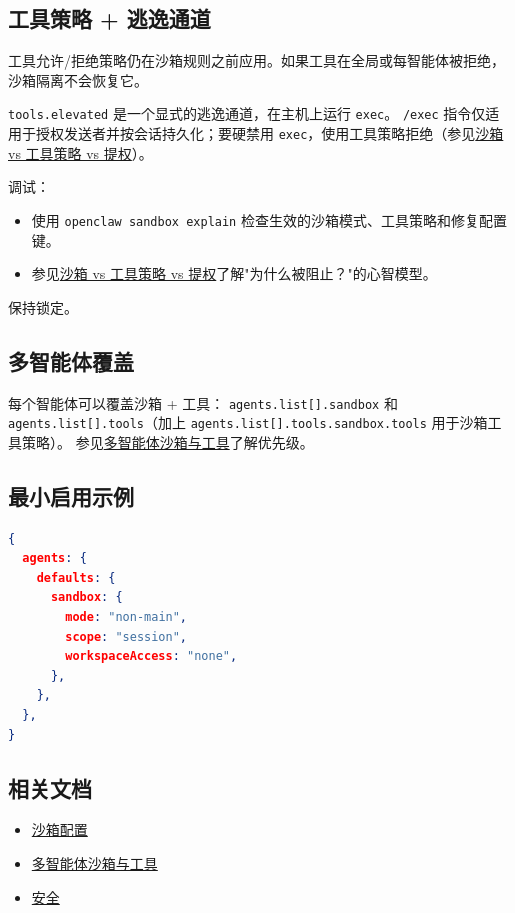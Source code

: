 \subsection{工具策略 + 逃逸通道}


工具允许/拒绝策略仍在沙箱规则之前应用。如果工具在全局或每智能体被拒绝，沙箱隔离不会恢复它。

\texttt{tools.elevated} 是一个显式的逃逸通道，在主机上运行 \texttt{exec}。
\texttt{/exec} 指令仅适用于授权发送者并按会话持久化；要硬禁用 \texttt{exec}，使用工具策略拒绝（参见\href{/gateway/sandbox-vs-tool-policy-vs-elevated}{沙箱 vs 工具策略 vs 提权}）。

调试：

\begin{itemize}
  \item 使用 \texttt{openclaw sandbox explain} 检查生效的沙箱模式、工具策略和修复配置键。
  \item 参见\href{/gateway/sandbox-vs-tool-policy-vs-elevated}{沙箱 vs 工具策略 vs 提权}了解"为什么被阻止？"的心智模型。
\end{itemize}

保持锁定。

\subsection{多智能体覆盖}


每个智能体可以覆盖沙箱 + 工具：
\texttt{agents.list[].sandbox} 和 \texttt{agents.list[].tools}（加上 \texttt{agents.list[].tools.sandbox.tools} 用于沙箱工具策略）。
参见\href{/tools/multi-agent-sandbox-tools}{多智能体沙箱与工具}了解优先级。

\subsection{最小启用示例}


\begin{lstlisting}[language=json]
{
  agents: {
    defaults: {
      sandbox: {
        mode: "non-main",
        scope: "session",
        workspaceAccess: "none",
      },
    },
  },
}
\end{lstlisting}


\subsection{相关文档}


\begin{itemize}
  \item \href{/gateway/configuration\#agentsdefaults-sandbox}{沙箱配置}
  \item \href{/tools/multi-agent-sandbox-tools}{多智能体沙箱与工具}
  \item \href{/gateway/security}{安全}
\end{itemize}



